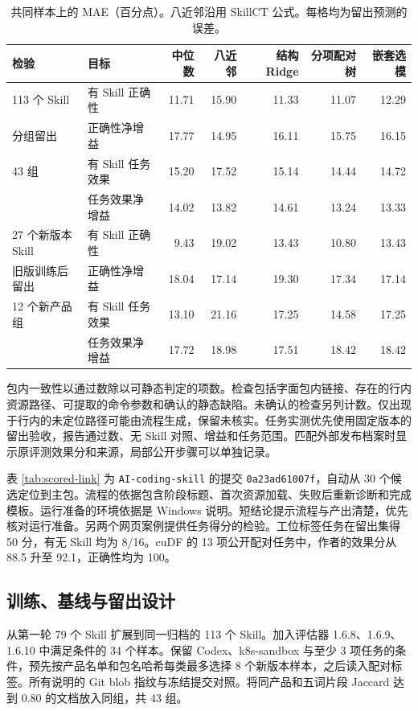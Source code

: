 \documentclass[final,5p,twocolumn,10pt]{elsarticle}
\newcommand{\code}[1]{\texttt{#1}}
\begin{document}
\begin{table}[!t]
\centering\small
\caption{共同样本上的 MAE（百分点）。八近邻沿用 SkillCT 公式。每格均为留出预测的误差。}
\label{tab:expanded-train}
\begin{tabularx}{\textwidth}{@{}p{}Xrrrrr@{}}
\toprule
检验 & 目标 & 中位数 & 八近邻 & 结构 Ridge & 分项配对树 & 嵌套选模 \\
\midrule
113 个 Skill & 有 Skill 正确性 & 11.71 & 15.90 & 11.33 & 11.07 & 12.29 \\
分组留出 & 正确性净增益 & 17.77 & 14.95 & 16.11 & 15.75 & 16.15 \\
43 组 & 有 Skill 任务效果 & 15.20 & 17.52 & 15.14 & 14.44 & 14.72 \\
 & 任务效果净增益 & 14.02 & 13.82 & 14.61 & 13.24 & 13.33 \\
\midrule
27 个新版本 Skill & 有 Skill 正确性 & 9.43 & 19.02 & 13.43 & 10.80 & 13.43 \\
旧版训练后留出 & 正确性净增益 & 18.04 & 17.14 & 19.30 & 17.34 & 17.14 \\
12 个新产品组 & 有 Skill 任务效果 & 13.10 & 21.16 & 17.25 & 14.58 & 17.25 \\
 & 任务效果净增益 & 17.72 & 18.98 & 17.51 & 18.42 & 18.42 \\
\bottomrule
\end{tabularx}
\end{table}

包内一致性以通过数除以可静态判定的项数。检查包括字面包内链接、存在的行内资源路径、可提取的命令参数和确认的静态缺陷。未确认的检查另列计数。仅出现于行内的未定位路径可能由流程生成，保留未核实。任务实测优先使用固定版本的留出验收，报告通过数、无 Skill 对照、增益和任务范围。匹配外部发布档案时显示原评测效果分和来源，局部公开步骤可以单独记录。

表 \ref{tab:scored-link} 为 \code{AI-coding-skill} 的提交 \code{0a23ad61007f}，自动从 30 个候选定位到主包\cite{workflow}。流程的依据包含阶段标题、首次资源加载、失败后重新诊断和完成模板。运行准备的环境依据是 Windows 说明。短结论提示流程与产出清楚，优先核对运行准备。另两个网页案例提供任务得分的检验。工位标签任务在留出集得 50 分，有无 Skill 均为 8/16。cuDF 的 13 项公开配对任务中，作者的效果分从 88.5 升至 92.1，正确性均为 100\cite{nvidiacorpus}。

\subsection{训练、基线与留出设计}

从第一轮 79 个 Skill 扩展到同一归档的 113 个 Skill。加入评估器 1.6.8、1.6.9、1.6.10 中满足条件的 34 个样本。保留 Codex、k8s-sandbox 与至少 3 项任务的条件，预先按产品名单和包名哈希每类最多选择 8 个新版本样本，之后读入配对标签。所有说明的 Git blob 指纹与冻结提交对照。将同产品和五词片段 Jaccard 达到 0.80 的文档放入同组，共 43 组。
\end{document}
